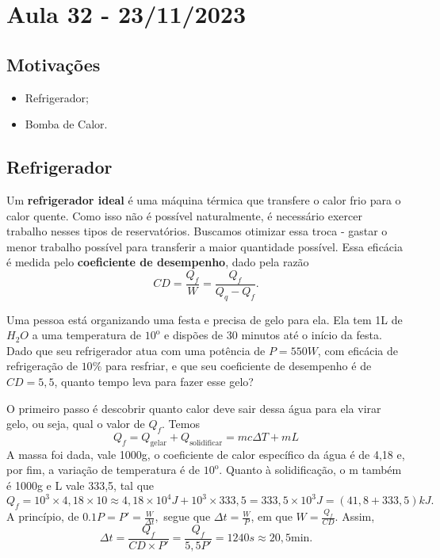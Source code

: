 \documentclass[phsyicsII_notes.tex]{subfiles}
\begin{document}
\section{Aula 32 - 23/11/2023}
\subsection{Motivações}
\begin{itemize}
	\item Refrigerador;
	\item Bomba de Calor.
\end{itemize}
\subsection{Refrigerador}
Um \textbf{refrigerador ideal} é uma máquina térmica que transfere o calor frio para o calor quente. Como isso não é possível
naturalmente, é necessário exercer trabalho nesses tipos de reservatórios. Buscamos otimizar essa troca - gastar o menor
trabalho possível para transferir a maior quantidade possível. Essa eficácia é medida pelo \textbf{coeficiente de desempenho},
dado pela razão
\[
	\boxed{CD = \frac{Q_{f}}{W} = \frac{Q_{f}}{Q_{q}-Q_{f}}}.
\]
\begin{example}
	Uma pessoa está organizando uma festa e precisa de gelo para ela. Ela tem 1L de \(H_{2}O\) a uma temperatura de \({10}^{\mathrm{o}}\) e dispões de 30 minutos até
	o início da festa. Dado que seu refrigerador atua com uma potência de \(P=550W\), com eficácia de refrigeração de \(10\%\) para resfriar,
	e que seu coeficiente de desempenho é de \(CD=5,5\), quanto tempo leva para fazer esse gelo?

	O primeiro passo é descobrir quanto calor deve sair dessa água para ela virar gelo, ou seja, qual o valor de \(Q_{f}\). Temos
	\[
		Q_{f} = Q_{\text{gelar}} + Q_{\text{solidificar}} = mc\Delta T + mL
	\]
	A massa foi dada, vale 1000g, o coeficiente de calor específico da água é de 4,18 e, por fim, a variação de temperatura é de \({10}^{\mathrm{o}}\).
	Quanto à solidificação, o m também é 1000g e L vale 333,5, tal que
	\[
		Q_{f} = 10^{3}\times4,18\times 10\approx 4,18\times10^{4}J + 10^{3}\times 333,5 = 333,5\times 10^{3}J = (41,8+333,5)kJ.
	\]
	A princípio, de \(0.1P = P' = \frac{W}{\Delta t},\) segue que \(\Delta t = \frac{W}{P}\), em que \(W = \frac{Q_{f}}{CD}\). Assim,
	\[
		\Delta t = \frac{Q_{f}}{CD\times P'} = \frac{Q_{f}}{5,5P'} = 1240s\approx 20,5 \text{min.}
	\]
\end{example}
\end{document}
